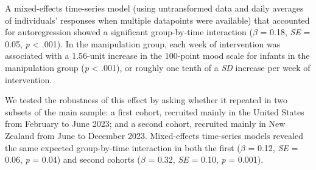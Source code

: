\documentclass[
]{article}
\begin{document}
A mixed-effects time-series model (using untransformed data and daily
averages of individuals' responses when multiple datapoints were
available) that accounted for autoregression showed a significant
group-by-time interaction (\(\beta\) = 0.18, \emph{SE} = 0.05, \emph{p}
\textless{} .001). In the manipulation group, each week of intervention
was associated with a 1.56-unit increase in the 100-point mood scale for
infants in the manipulation group (\emph{p} \textless{} .001), or
roughly one tenth of a \emph{SD} increase per week of intervention.

We tested the robustness of this effect by asking whether it repeated in
two subsets of the main sample: a first cohort, recruited mainly in the
United States from February to June 2023; and a second cohort, recruited
mainly in New Zealand from June to December 2023. Mixed-effects
time-series models revealed the same expected group-by-time interaction
in both the first (\(\beta\) = 0.12, \emph{SE} = 0.06, \emph{p} = 0.04)
and second cohorts (\(\beta\) = 0.32, \emph{SE} = 0.10, \emph{p} =
0.001).
\end{document}
